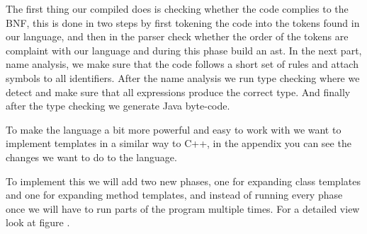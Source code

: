 \iffalse
We want to implement templates in a similar way to C++, in the appendix you can
see the changes we want to do to the language.

To implement this we will add a new phase between the name analysis and type
checking to expand the templates with the needed types. If we for example
define a method \textbf{max\tmpl{T}(a:T,b:T):T} and call it with a pair of Ints
and a pair of Strings we need to expand the code into one method for ints and
one for strings, for example \textbf{max\$Int(a:Int,b:Int):Int}.

This in addition to adding a new Type or Symbol for templates is all the
changes we think are necessary for implementing templates. In particular, the
type checking and code generation phases should not need to be modified since
we will require explicit type arguments in references to template types and
methods. Automatic inference of type parameters where possible is proposed as a
further extension if we get the time.

In the name analysis phase we simply add a template symbol to all references to
templates, and in the phase before type checking we expand the template by adding
any needed classes and methods to the AST. The template symbol contains a list of
either methodSymbols or classSymbols for all the versions that has been created.
\fi

\iftrue
The first thing our compiled does is checking whether the code complies to
the BNF, this is done in two steps by first tokening the code into the
tokens found in our language, and then in the parser check whether the order
of the tokens are complaint with our language and during this phase build an ast.
In the next part, name analysis, we make sure that the code follows a short set
of rules and attach symbols to all identifiers. After the name analysis we run type
checking where we detect and make sure that all expressions produce the correct
type. And finally after the type checking we generate Java byte-code.

To make the language a bit more powerful and easy to work with we want to
implement templates in a similar way to C++, in the appendix you can
see the changes we want to do to the language.

To implement this we will add two new phases, one for expanding class templates
and one for expanding method templates, and instead of running every phase once
we will have to run parts of the program multiple times. For a detailed view
look at figure .

\fi
